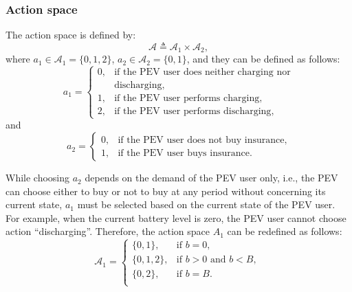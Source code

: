 \documentclass[twocolumn,10pt]{IEEEtran}
\begin{document}
\subsubsection{Action space}

The action space is defined by:
\begin{equation}
\mathcal{A} \triangleq \mathcal{A}_1 \times \mathcal{A}_2	,
\end{equation}
where $a_1 \in \mathcal{A}_1 = \{0,1,2\}$, $a_2 \in \mathcal{A}_2= \{0,1\}$, and they can be defined as follows:
\begin{equation}
a_1 = \left\{
\begin{array}{ll}
0, & \text{if the PEV user does neither charging nor} \\
     &  \text{discharging},	\\
1, & \text{if the PEV user performs charging},	\\
2, & \text{if the PEV user performs discharging},
\end{array}
\right.
\end{equation}
and 
\begin{equation}
a_2 = \left\{
\begin{array}{ll}
0, & \text{if the PEV user does not buy insurance} 	,	\\
1, & \text{if the PEV user buys insurance} 	.
\end{array}
\right.
\end{equation}

While choosing $a_2$ depends on the demand of the PEV user only, i.e., the PEV can choose either to buy or not to buy at any period without concerning its current state, $a_1$ must be selected based on the current state of the PEV user. For example, when the current battery level is zero, the PEV user cannot choose action ``discharging''. Therefore, the action space $A_1$ can be redefined as follows: 
\begin{equation}
\label{eq:}
\mathcal{A}_{1} = \left\{
\begin{array}{ll}
\{0,1\}, & \text{if $b=0$, }\\
\{0,1,2\}, & \text{if $b>0$ and $b<B$, }\\
\{0,2\}, & \text{if $b=B$. }\\
\end{array}
\right.
\end{equation}


\end{document}
